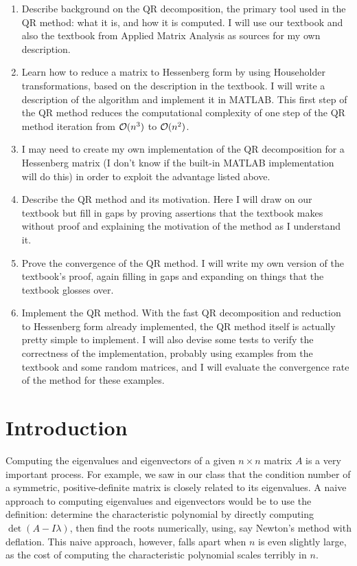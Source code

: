 \documentclass{article}
\begin{document}
\begin{enumerate}
	\item Describe background on the QR decomposition, the primary tool used in the QR method: what it is, and how it is computed. I will use our textbook \cite{ackleh_2009} and also the textbook from Applied Matrix Analysis \cite{meyer_2008} as sources for my own description.
	
	\item Learn how to reduce a matrix to Hessenberg form by using Householder transformations, based on the description in the textbook. I will write a description of the algorithm and implement it in MATLAB. This first step of the QR method reduces the computational complexity of one step of the QR method iteration from $\mathcal{O}(n^3)$ to $\mathcal{O}(n^2)$.
	
	\item I may need to create my own implementation of the QR decomposition for a Hessenberg matrix (I don't know if the built-in MATLAB implementation will do this) in order to exploit the advantage listed above.
	
	\item Describe the QR method and its motivation. Here I will draw on our textbook but fill in gaps by proving assertions that the textbook makes without proof and explaining the motivation of the method as I understand it.
	
	\item Prove the convergence of the QR method. I will write my own version of the textbook's proof, again filling in gaps and expanding on things that the textbook glosses over.
	
	\item Implement the QR method. With the fast QR decomposition and reduction to Hessenberg form already implemented, the QR method itself is actually pretty simple to implement. I will also devise some tests to verify the correctness of the implementation, probably using examples from the textbook and some random matrices, and I will evaluate the convergence rate of the method for these examples.
\end{enumerate}

\clearpage

\section{Introduction}

Computing the eigenvalues and eigenvectors of a given $n\times n$ matrix $A$ is a very important process. For example, we saw in our class that the condition number of a symmetric, positive-definite matrix is closely related to its eigenvalues. A naive approach to computing eigenvalues and eigenvectors would be to use the definition: determine the characteristic polynomial by directly computing $\det(A - I\lambda)$, then find the roots numerically, using, say Newton's method with deflation. This naive approach, however, falls apart when $n$ is even slightly large, as the cost of computing the characteristic polynomial scales terribly in $n$.
\end{document}
